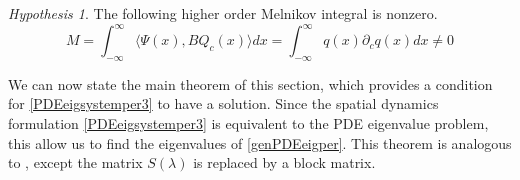 \documentclass[11pt,reqno]{amsart}
\theoremstyle{plain}
\theoremstyle{definition}
\theoremstyle{remark}
\newtheorem{hypothesis}[theorem]{Hypothesis}
\begin{document}
\begin{hypothesis}\label{Melnikov2hyp}
The following higher order Melnikov integral is nonzero.
\begin{equation}\label{M2}
M = \int_{-\infty}^\infty \langle \Psi(x), B Q_c(x) \rangle dx =
\int_{-\infty}^\infty q(x) \partial_c q(x) dx \neq 0
\end{equation}
\end{hypothesis}

We can now state the main theorem of this section, which provides a condition for \cref{PDEeigsystemper3} to have a solution. Since the spatial dynamics formulation \cref{PDEeigsystemper3} is equivalent to the PDE eigenvalue problem, this allow us to find the eigenvalues of \cref{genPDEeigper}. This theorem is analogous to \cite[Theorem 2]{Sandstede1998}, except the matrix $S(\lambda)$ is replaced by a block matrix.
\end{document}
